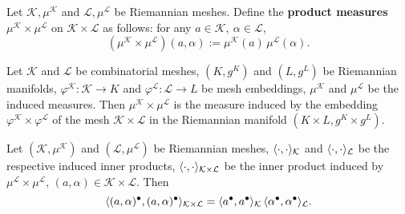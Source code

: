 \begin{definition}
  Let $\mathcal{K}, \mu^{\mathcal{K}}$ and $\mathcal{L}, \mu^{\mathcal{L}}$ be
  Riemannian meshes.
  Define the \textbf{product measures}
  $\mu^{\mathcal{K}} \times \mu^{\mathcal{L}}$
  on $\mathcal{K} \times \mathcal{L}$ as follows:
  for any $a \in \mathcal{K},\ \alpha \in \mathcal{L}$,
  \begin{equation}
    (\mu^{\mathcal{K}} \times \mu^{\mathcal{L}})(a, \alpha)
    := \mu^{\mathcal{K}}(a)\, \mu^{\mathcal{L}}(\alpha).
  \end{equation}
\end{definition}
\begin{proposition}
  Let
    $\mathcal{K}$ and $\mathcal{L}$ be combinatorial meshes,
    $(K, g^K)$ and $(L, g^L)$ be Riemannian manifolds,
    $\varphi^{\mathcal{K}} \colon \mathcal{K} \to K$ and
      $\varphi^{\mathcal{L}} \colon \mathcal{L} \to L$
      be mesh embeddings,
    $\mu^{\mathcal{K}}$ and $\mu^{\mathcal{L}}$ be the induced measures.
  Then $\mu^{\mathcal{K}} \times \mu^{\mathcal{L}}$ is the measure induced by
  the embedding $\varphi^{\mathcal{K}} \times \varphi^{\mathcal{L}}$ of the mesh
  $\mathcal{K} \times \mathcal{L}$
  in the Riemannian manifold $(K \times L, g^K \times g^L)$.
\end{proposition}
\begin{proposition}
  Let
    $(\mathcal{K}, \mu^{\mathcal{K}})$ and $(\mathcal{L}, \mu^{\mathcal{L}})$
      be Riemannian meshes,
    $\langle\cdot,\cdot\rangle_{\mathcal{K}}$ and
      $\langle\cdot,\cdot\rangle_{\mathcal{L}}$
      be the respective induced inner products,
    $\langle\cdot,\cdot\rangle_{\mathcal{K} \times \mathcal{L}}$
      be the inner product induced by
      $\mu^{\mathcal{L}} \times \mu^{\mathcal{L}}$,
    $(a, \alpha) \in \mathcal{K} \times \mathcal{L}$.
  Then
  \begin{equation}
    \langle(a, \alpha)^\bullet,(a, \alpha)^\bullet\rangle
    _{\mathcal{K} \times \mathcal{L}}
    = \langle a^\bullet,a^\bullet\rangle_\mathcal{K}\, 
      \langle\alpha^\bullet,\alpha^\bullet\rangle_\mathcal{L}.
  \end{equation}
\end{proposition}
